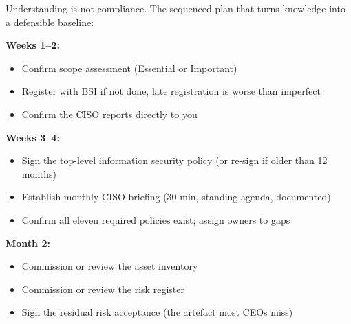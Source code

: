 \documentclass[11pt,a4paper,twoside]{book}
\begin{document}
Understanding is not compliance. The sequenced plan that turns knowledge into a defensible baseline:

\begin{center}
\end{center}

\textbf{Weeks 1--2:}
\begin{itemize}
  \item Confirm scope assessment (Essential or Important)
  \item Register with BSI if not done, late registration is worse than imperfect
  \item Confirm the CISO reports directly to you
\end{itemize}

\textbf{Weeks 3--4:}
\begin{itemize}
  \item Sign the top-level information security policy (or re-sign if older than 12 months)
  \item Establish monthly CISO briefing (30 min, standing agenda, documented)
  \item Confirm all eleven required policies exist; assign owners to gaps
\end{itemize}

\textbf{Month 2:}
\begin{itemize}
  \item Commission or review the asset inventory
  \item Commission or review the risk register
  \item Sign the residual risk acceptance (the artefact most CEOs miss)
\end{itemize}
\end{document}
